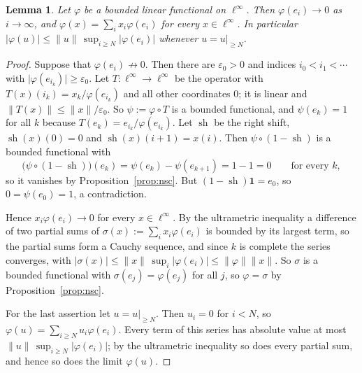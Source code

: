 \documentclass[11pt]{amsart}
\newtheorem{lemma}[theorem]{Lemma}
\theoremstyle{remark}
\newcommand{\kk}{k}
\newcommand{\linf}{\ell^\infty}
\newcommand{\sh}{\operatorname{sh}}
\newcommand{\abs}[1]{\lvert #1\rvert}
\newcommand{\norm}[1]{\lVert #1\rVert}
\newcommand{\1}{\mathbf{1}}
\newcommand{\tail}[2]{#2|_{\ge #1}}
\begin{document}
\begin{lemma}\label{lem:dual}
Let $\varphi$ be a bounded linear functional on $\linf$. Then $\varphi(e_i)\to0$ as $i\to\infty$, and $\varphi(x)=\sum_ix_i\varphi(e_i)$ for every
$x\in\linf$. In particular $\abs{\varphi(u)}\le\norm u\,\sup_{i\ge N}\abs{\varphi(e_i)}$ whenever $u=\tail Nu$.
\end{lemma}
\begin{proof}
Suppose that $\varphi(e_i)\not\to0$. Then there are $\varepsilon_0>0$ and indices $i_0<i_1<\cdots$ with
$\abs{\varphi(e_{i_k})}\ge\varepsilon_0$. Let $T\colon\linf\to\linf$ be the operator with $T(x)(i_k)=x_k/\varphi(e_{i_k})$ and all other
coordinates $0$; it is linear and $\norm{T(x)}\le\norm x/\varepsilon_0$. So $\psi:=\varphi\circ T$ is a bounded functional, and
$\psi(e_k)=1$ for all $k$ because $T(e_k)=e_{i_k}/\varphi(e_{i_k})$. Let $\sh$ be the right shift, $\sh(x)(0)=0$ and $\sh(x)(i+1)=x(i)$. Then $\psi\circ(1-\sh)$ is a bounded functional with
\[
\bigl(\psi\circ(1-\sh)\bigr)(e_k)=\psi(e_k)-\psi(e_{k+1})=1-1=0\qquad\text{for every }k,
\]
so it vanishes by Proposition~\ref{prop:nsc}. But
$(1-\sh)\1=e_0$, so $0=\psi(e_0)=1$, a contradiction.

Hence $x_i\varphi(e_i)\to0$ for every $x\in\linf$. By the ultrametric inequality a difference of two partial sums of
$\sigma(x):=\sum_ix_i\varphi(e_i)$ is bounded by its largest term, so the partial sums form a Cauchy sequence, and since $\kk$
is complete the series converges, with $\abs{\sigma(x)}\le\norm x\,\sup_i\abs{\varphi(e_i)}\le\norm\varphi\norm x$. So $\sigma$ is a bounded functional with
$\sigma(e_j)=\varphi(e_j)$ for all $j$, so $\varphi=\sigma$ by Proposition~\ref{prop:nsc}.

For the last assertion let $u=\tail Nu$. Then $u_i=0$ for $i<N$, so
$\varphi(u)=\sum_{i\ge N}u_i\varphi(e_i)$. Every term of this series has absolute value at most
$\norm u\,\sup_{i\ge N}\abs{\varphi(e_i)}$; by the ultrametric inequality so does every partial sum, and hence so does the limit
$\varphi(u)$.
\end{proof}
\end{document}
